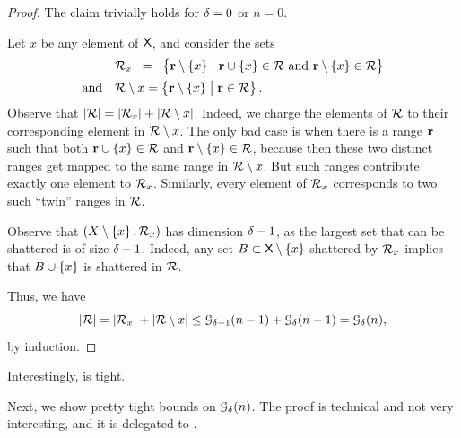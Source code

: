 \begin{proof}
    The claim trivially holds for $\delta=0$ or $n=0$.
    
    Let $x$ be any element of $\textsf{X}$, and consider the sets
    \begin{align*}
        &\RangeSet_x%
        \EQ%
        \Set{ \range \setminus \brc{x} }%
        {\bigl. \range \cup \brc{x} \in \RangeSet \text{ and }%
           \range \setminus \brc{x} \in \RangeSet}%
        \\[0.05cm]
        \text{and}\quad%
        &\RangeSet \setminus x%
        =%
        \Set{ \range
           \setminus \brc{x} }{ \bigl. \range \in \RangeSet}.
    \end{align*}
    Observe that $\left| {{\mathcal{R}}} \right| = \left| {{\mathcal{R}}_x} \right| +
    \left| {{\mathcal{R}} \setminus x} \right|$. Indeed, we charge the elements of
    ${\mathcal{R}}$ to their corresponding element in ${\mathcal{R}}\setminus
    x$.  The only bad case is when there is a range $\mathbf{r}$ such that
    both $\mathbf{r}\cup \left\{ {x} \right\} \in {\mathcal{R}}$ and $\mathbf{r}\setminus
    \left\{ {x} \right\} \in {\mathcal{R}}$, because then these two distinct ranges get
    mapped to the same range in ${\mathcal{R}} \setminus x$. But such
    ranges contribute exactly one element to ${\mathcal{R}}_x$. Similarly,
    every element of ${\mathcal{R}}_x$ corresponds to two such ``twin''
    ranges in ${\mathcal{R}}$.
    
    Observe that $( X \setminus \left\{ {x} \right\}, {\mathcal{R}}_x)$ has \VC{}
    dimension $\delta-1$, as the largest set that can be shattered is of
    size $\delta-1$.  Indeed, any set $B \subset \textsf{X} \setminus
    \left\{ {x} \right\}$ shattered by ${\mathcal{R}}_x$ implies that $B \cup \left\{ {x} \right\}$
    is shattered in ${\mathcal{R}}$.

    
    Thus, we have
    \begin{equation*}
        \cardin{\RangeSet}%
        =%
        \cardin{\RangeSet_x} + \cardin{\RangeSet
           \setminus x} \leq \Growth{\Dim-1}{n-1} +
        \Growth{\Dim}{n-1}%
        =%
        \Growth{\Dim}{n},        
    \end{equation*}
    by induction.
\end{proof}



Interestingly,  is tight.

Next, we show pretty tight bounds on $\Growth{\Dim}{n}$.  The proof is
technical and not very interesting, and it is delegated to
.

